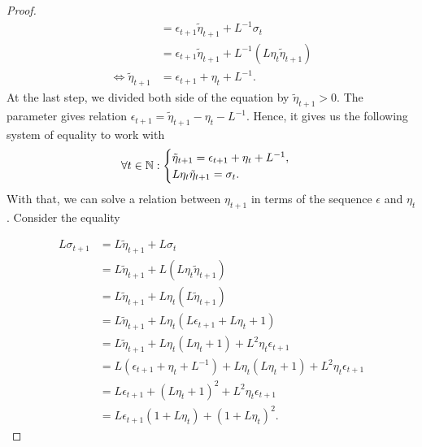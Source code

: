 \documentclass[12pt]{article}
\begin{document}
\begin{proof}
\begin{align*}
                &= 
                \epsilon_{t + 1} \tilde \eta_{t + 1} + L^{-1} \sigma_t
                \\
                &= 
                \epsilon_{t + 1} \tilde \eta_{t + 1} 
                + L^{-1}(L \eta_t \tilde \eta_{t + 1})
                \\
                \iff 
                \tilde \eta_{t + 1} &= \epsilon_{t + 1} + \eta_t + L^{-1}. 
            \end{align*}
            At the last step, we divided both side of the equation by $\tilde \eta_{t + 1} > 0$.
            The parameter gives relation $\epsilon_{t+1} = \tilde \eta_{t + 1} - \eta_t - L^{-1}$. 
            Hence, it gives us the following system of equality to work with 
            \begin{align*}
                \forall t \in \mathbb N: 
                \begin{cases}
                    \tilde \eta_{t + 1} = \epsilon_{t + 1} + \eta_t + L^{-1}, 
                    \\
                    L \eta_t \tilde \eta_{t + 1} = \sigma_t.     
                \end{cases}
            \end{align*}
            With that, we can solve a relation between $\eta_{t + 1}$ in terms of the sequence $\epsilon$ and $\eta_t$.
            Consider the equality 

            \begin{align*}
                L \sigma_{t + 1} &= L \tilde \eta_{t + 1} + L \sigma_t
                \\
                &=
                L \tilde \eta_{t + 1}  + L (L \eta_t \tilde \eta_{t + 1})
                \\
                &= L \tilde \eta_{t+ 1} + L \eta_t (L \tilde \eta_{t + 1})
                \\
                &=  L \tilde \eta_{t+ 1} + L \eta_t (L \epsilon_{t + 1} + L \eta_t + 1)
                \\
                &=  L \tilde \eta_{t+ 1} + L \eta_t (L \eta_t + 1) + L^2 \eta_t \epsilon_{t + 1}
                \\
                &= L (\epsilon_{t +1} + \eta_t + L^{-1}) + L\eta_t(L \eta_t + 1) + L^2\eta_t \epsilon_{t + 1}
                \\
                &= L \epsilon_{t + 1} + (L\eta_t + 1)^2 + L^2\eta_t \epsilon_{t + 1}
                \\
                &= 
                L \epsilon_{t + 1}(1 + L \eta_t) + (1 + L \eta_t)^2. 
            \end{align*}


\end{proof}
\end{document}

